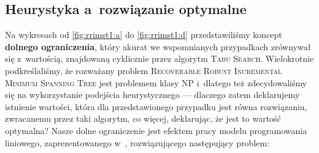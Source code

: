\subsection{Heurystyka a~rozwiązanie optymalne}

Na wykresach od \ref{fig:rrimst1:a} do \ref{fig:rrimst1:d} przedstawiliśmy koncept \textbf{dolnego ograniczenia}, który akurat we wspomnianych przypadkach zrównywał się z~wartością, znajdowaną cyklicznie przez algorytm \textsc{Tabu Search}. Wielokrotnie podkreślaliśmy, że rozważany problem \textsc{Recoverable Robust Incremental Minimum Spanning Tree} jest problemem klasy \textsc{NP} i~dlatego też zdecydowaliśmy się na wykorzystanie podejścia heurystycznego --- dlaczego zatem deklarujemy istnienie wartości, która dla przedstawionego przypadku jest równa rozwiązaniu, zwracanemu przez taki algorytm, co więcej, deklarując, że jest to wartość optymalna? Nasze dolne ograniczenie jest efektem pracy modelu programowania liniowego, zaprezentowanego w~\cite{DBLP:journals/corr/HradovichKZ16}, rozwiązującego następujący problem:


